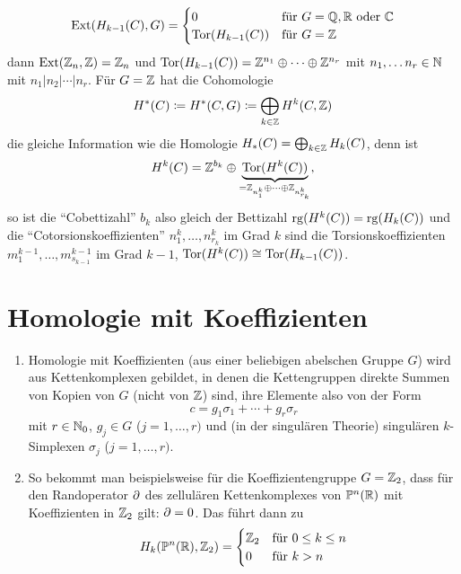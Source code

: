 \begin{kommentar}
\begin{enumerate}
\begin{equation*}
        \mathrm{Ext}(H_{k-1}(C),G) =
        \begin{cases}
          0 & \text{für $G = \mathbb{Q},\mathbb{R}$ oder $\mathbb C$}\\
          \mathrm{Tor}(H_{k-1}(C))  & \text{für $G = \mathbb{Z}$}
        \end{cases}
      \end{equation*}
      dann $\mathrm{Ext}(\mathbb{Z}_n,\mathbb{Z}) = \mathbb{Z}_n$ und $\mathrm{Tor}(H_{k-1}(C)) = \mathbb{Z}^{n_1} \oplus \dotsb \oplus \mathbb{Z}^{n_r}$ mit $n_1, \dotsc n_r \in \mathbb{N}$ mit $n_1 | n_2 | \dotsb | n_r$.
      Für $G = \mathbb{Z}$ hat die Cohomologie
      \begin{equation*}
        H^*(C) \coloneqq H^*(C,G) \coloneqq \bigoplus_{k \in \mathbb{Z}} H^k(C,\mathbb{Z})
      \end{equation*}
      die gleiche Information wie die Homologie $H_*(C) = \bigoplus_{k\in\mathbb{Z}}H_k(C)$, denn ist
      \begin{equation*}
        H^k(C) = \mathbb{Z}^{b_k} \oplus \underbrace{\mathrm{Tor}(H^k(C))}_{= \mathbb{Z}_{n_1^k} \oplus \dotsb \oplus \mathbb{Z}_{n_{r_k}^k}},
      \end{equation*}
      so ist die "`Cobettizahl"' $b_k$ also gleich der Bettizahl $\operatorname{rg}(H^k(C)) = \operatorname{rg}(H_k(C))$ und die "`Cotorsionskoeffizienten"' $n_1^k, \dotsc, n_{r_k}^k$ im Grad $k$ sind die Torsionskoeffizienten $m_{1}^{k-1}, \dotsc, m_{s_{k-1}}^{k-1}$ im Grad $k-1$, $\mathrm{Tor}(H^k(C)) \cong \mathrm{Tor}(H_{k-1}(C))$.
  \end{enumerate}
\end{kommentar}


\section{Homologie mit Koeffizienten}

\begin{motivation}
  \begin{enumerate}
    \item
      Homologie mit Koeffizienten (aus einer beliebigen abelschen  Gruppe $G$) wird aus Kettenkomplexen gebildet, in denen die Kettengruppen direkte Summen von Kopien von $G$ (nicht von $\mathbb{Z}$) sind, ihre Elemente also von der Form
      \begin{equation*}
        c = g_{1}\sigma_1 + \dotsb + g_r\sigma_r
      \end{equation*}
      mit $r \in \mathbb{N}_0$, $g_j \in G$ ($j = 1,\dotsc, r)$ und (in der singulären Theorie) singulären $k$-Simplexen $\sigma_j$ ($j = 1, \dotsc, r)$.
    \item
      So bekommt man beispielsweise für die Koeffizientengruppe $G = \mathbb{Z}_2$, dass für den Randoperator $\partial$ des zellulären Kettenkomplexes von $\mathbb{P}^n(\mathbb{R})$ mit Koeffizienten in $\mathbb{Z}_2$ gilt: $\partial = 0$.
      Das führt dann zu
      \begin{equation*}
        H_k(\mathbb{P}^n(\mathbb{R}),\mathbb{Z}_2) =
        \begin{cases}
          \mathbb{Z}_2 & \text{für $0 \le k \le n$}\\
          0   & \text{für $k > n$}
        \end{cases}
      \end{equation*}
  \end{enumerate}
\end{motivation}


